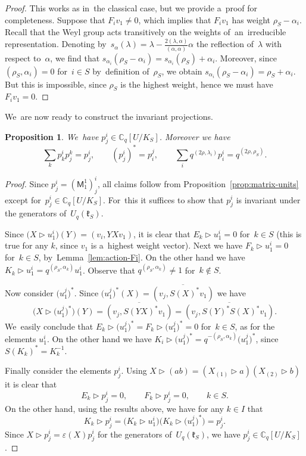\documentclass[pdftex]{sigma}
\numberwithin{equation}{section}
\newtheorem{Proposition}[Theorem]{Proposition}
 { \theoremstyle{definition}
\newtheorem{Definition}[Theorem]{Definition}
\newtheorem{Note}[Theorem]{Note}
\newtheorem{Example}[Theorem]{Example}
\newtheorem{Remark}[Theorem]{Remark} }
\newcommand{\UqkS}{U_q(\mathfrak{k}_S)}
\newcommand{\Cqflag}{\mathbb{C}_q[U / K_S]}
\newcommand{\matuni}{\mathsf{M}}
\begin{document}
\begin{proof}
This works as in~the classical case, but we provide a~proof for completeness.
Suppose that $F_i v_1 \neq 0$, which implies that $F_i v_1$ has weight $\rho_S - \alpha_i$.
Recall that the Weyl group acts transitively on the weights of~an~irreducible representation.
Denoting by~$s_\alpha(\lambda) = \lambda - \frac{2 (\lambda, \alpha)}{(\alpha, \alpha)} \alpha$ the reflection of~$\lambda$ with respect to~$\alpha$, we find that $s_{\alpha_i}(\rho_S - \alpha_i) = s_{\alpha_i}(\rho_S) + \alpha_i$.
Moreover, since $(\rho_S, \alpha_i) = 0$ for~$i \in S$ by~definition of~$\rho_S$, we obtain $s_{\alpha_i}(\rho_S - \alpha_i) = \rho_S + \alpha_i$.
But this is impossible, since $\rho_S$ is the highest weight, hence we must have $F_i v_1 = 0$.
\end{proof}

We~are now ready to construct the invariant projections.

\begin{Proposition}
\label{prop:p-properties}
We~have $p^i_j \in \Cqflag$. Moreover we have
\[
\sum_k p^i_k p^k_j = p^i_j, \qquad
(p^i_j)^* = p^j_i, \qquad
\sum_i q^{(2 \rho, \lambda_i)} p^i_i = q^{(2 \rho, \rho_S)}.
\]
\end{Proposition}

\begin{proof}
Since $p^i_j = (\matuni^1_1)^i_j$, all claims follow from Proposition~\ref{prop:matrix-units} except for~$p^i_j \in \Cqflag$.
For~this it suffices to show that $p^i_j$ is invariant under the generators of~$\UqkS$.

Since $\big(X \triangleright u^i_1\big)(Y) = (v_i, Y X v_1)$, it is clear that $E_k \triangleright u^i_1 = 0$ for~$k \in S$ (this is true for any $k$, since $v_1$ is a~highest weight vector).
Next we have $F_k \triangleright u^i_1 = 0$ for~$k \in S$, by~Lemma~\ref{lem:action-Fi}.
On the other hand we have $K_k \triangleright u^i_1 = q^{(\rho_S, \alpha_k)} u^i_1$. Observe that $q^{(\rho_S, \alpha_k)} \neq 1$ for~$k \notin S$.

Now consider $\big(u^j_1\big)^*$. Since $\big(u^j_1\big)^*(X) = \overline{(v_j, S(X)^* v_1)}$ we have
\[
\big(X \triangleright \big(u^j_1\big)^*\big)(Y) = \overline{(v_j, S(Y X)^* v_1)} = \overline{(v_j, S(Y)^* S(X)^* v_1)}.
\]
We~easily conclude that $E_k \triangleright \big(u^j_1\big)^* = F_k \triangleright \big(u^j_1\big)^* = 0$ for~$k \in S$, as for the elements $u^i_1$.
On the other hand we have $K_i \triangleright \big(u^j_1\big)^* = q^{-(\rho_S, \alpha_k)} \big(u^j_1\big)^*$, since $S(K_k)^* = K_k^{-1}$.

Finally consider the elements $p^i_j$. Using $X \triangleright (a b) = (X_{(1)} \triangleright a) (X_{(2)} \triangleright b)$ it is clear that
\[
E_k \triangleright p^i_j = 0, \qquad
F_k \triangleright p^i_j = 0, \qquad
k \in S.
\]
On the other hand, using the results above, we have for any $k \in I$ that
\[
K_k \triangleright p^i_j = \big(K_k \triangleright u^i_1\big) \big(K_k \triangleright \big(u^j_1\big)^*\big) = p^i_j.
\]
Since $X \triangleright p^i_j = \varepsilon(X) p^i_j$ for the generators of~$\UqkS$, we have $p^i_j \in \Cqflag$.
\end{proof}
\end{document}
